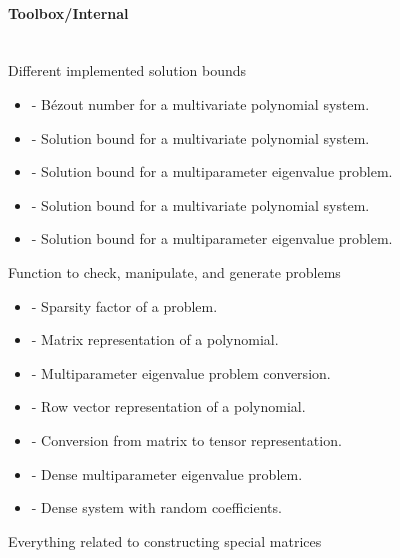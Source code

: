 \documentclass{manual}
\begin{document}
        \paragraph*{Toolbox/Internal} \phantom{-}\\
        \noindent Different implemented solution bounds
        \begin{itemize}
            \item {} - Bézout number for a multivariate polynomial system.
            \item {} - Solution bound for a multivariate polynomial system.
            \item {} - Solution bound for a multiparameter eigenvalue problem.
            \item {} - Solution bound for a multivariate polynomial system.
            \item {} - Solution bound for a multiparameter eigenvalue problem.
        \end{itemize}
        \noindent Function to check, manipulate, and generate problems
        \begin{itemize}
            \item {} - Sparsity factor of a problem.
            \item {} - Matrix representation of a polynomial.
            \item {} - Multiparameter eigenvalue problem conversion.
            \item {} - Row vector representation of a polynomial.
            \item {} - Conversion from matrix to tensor representation.
            \item {} - Dense multiparameter eigenvalue problem.
            \item {} - Dense system with random coefficients.
        \end{itemize}
        \noindent Everything related to constructing special matrices
\end{document}
